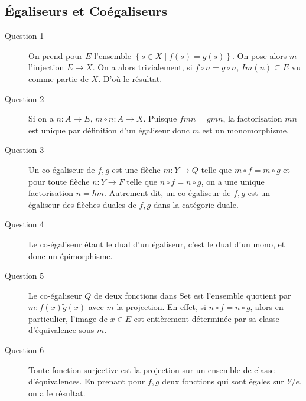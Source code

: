 \documentclass[math, info]{cours}
\begin{document}
\subsection{Égaliseurs et Coégaliseurs}
\begin{description}
	\item[Question 1] On prend pour $E$ l'ensemble $\left\{s \in X\mid f(s) = g(s) \right\}$. On pose alors $m$ l'injection $E \to X$.
		On a alors trivialement, si $f\circ n = g\circ n$, $Im(n) \subseteq E$ vu comme partie de $X$.
		D'où le résultat.
	\item[Question 2] Si on a $n: A \to E$, $m\circ n: A \to X$. Puisque $fmn = gmn$, la factorisation $mn$ est unique par définition d'un égaliseur donc $m$ est un monomorphisme.
	\item[Question 3] Un co-égaliseur de $f, g$ est une flèche $m : Y \to Q$ telle que $m\circ f = m\circ g$ et pour toute flèche $n: Y \to F$ telle que $n \circ f = n \circ g$, on a une unique factorisation $n = hm$.
		Autrement dit, un co-égaliseur de $f, g$ est un égaliseur des flèches duales de $f, g$ dans la catégorie duale.
	\item[Question 4] Le co-égaliseur étant le dual d'un égaliseur, c'est le dual d'un mono, et donc un épimorphisme.
	\item[Question 5] Le co-égaliseur $Q$ de deux fonctions dans $\mathrm{Set}$ est l'ensemble quotient par $m: f(x) \tilde g(x)$ avec $m$ la projection.
		En effet, si $n \circ f = n\circ g$, alors en particulier, l'image de $x \in E$ est entièrement déterminée par sa classe d'équivalence sous $m$.
	\item[Question 6] Toute fonction surjective est la projection sur un ensemble de classe d'équivalences.
		En prenant pour $f, g$ deux fonctions qui sont égales sur $Y / e$, on a le résultat.
\end{description}
\end{document}
